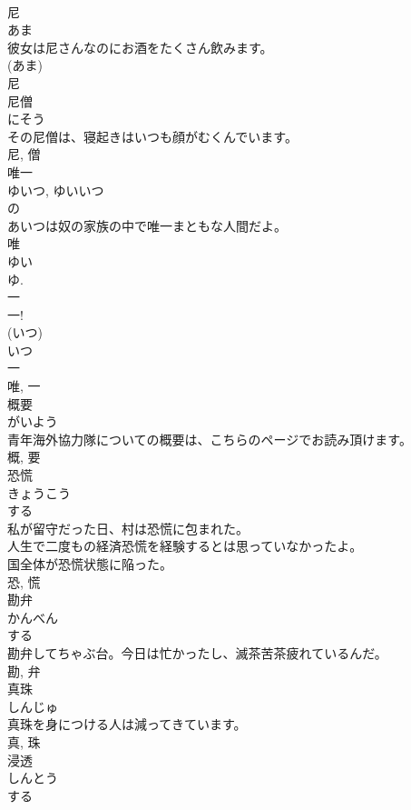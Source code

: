 \documentclass[8pt]{extreport}
\begin{document}
\begin{CJK}{UTF8}{min}
\\	尼	
\\	あま	
\\	彼女は尼さんなのにお酒をたくさん飲みます。	
\\	(あま) 
\\	尼	
\\	尼僧	
\\	にそう	
\\	その尼僧は、寝起きはいつも顔がむくんでいます。	
\\	尼, 僧	
\\	唯一	
\\	ゆいつ, ゆいいつ	
\\	の 
\\	あいつは奴の家族の中で唯一まともな人間だよ。	
\\	唯 
\\	ゆい 
\\	ゆ. 
\\	一 
\\	一! 
\\	(いつ) 
\\	いつ 
\\	一 
\\	唯, 一	
\\	概要	
\\	がいよう	
\\	青年海外協力隊についての概要は、こちらのページでお読み頂けます。	
\\	概, 要	
\\	恐慌	
\\	きょうこう	
\\	する 
\\	私が留守だった日、村は恐慌に包まれた。	
\\	人生で二度もの経済恐慌を経験するとは思っていなかったよ。	
\\	国全体が恐慌状態に陥った。	
\\	恐, 慌	
\\	勘弁	
\\	かんべん	
\\	する 
\\	勘弁してちゃぶ台。今日は忙かったし、滅茶苦茶疲れているんだ。	
\\	勘, 弁	
\\	真珠	
\\	しんじゅ	
\\	真珠を身につける人は減ってきています。	
\\	真, 珠	
\\	浸透	
\\	しんとう	
\\	する 

\end{CJK}
\end{document}
